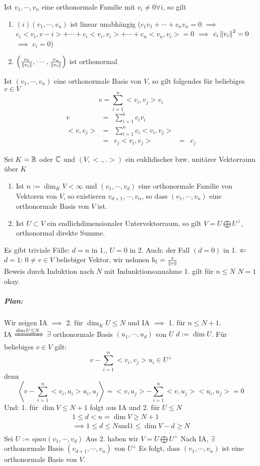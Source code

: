 \begin{Bem}
  Ist $v_1,\cdots,v_n$ eine orthonormale Familie mit $v_i \neq 0\forall i$, so gilt 
  \begin{enumerate}
    \item $(i)(v_1,\cdots,v_n)$ ist linear unabhängig ($c_1v_1+\cdots+c_nv_n=0$ $\implies$ $c_i <v_i,v-i>+\cdots+c_i<v_i,v_i>+\cdots+c_n<v_n,v_i>=0$ $\implies$ $c_i\left\| v_i \right\|^2=0$ $\implies$ $c_i=0$)
    \item $\left(\frac{v_1}{\left\| v_i \right\|},\cdots,\frac{v_n}{\left\| v_i \right\|}\right)$ ist orthonormal
  \end{enumerate}
\end{Bem}
\begin{Sat}
  Ist $(v_1,\cdots,v_n)$ eine orthonormale Basis von $V$, so gilt folgendes für beliebiges $v\in V$
  \[v=\sum^n_{i=1}<v_i,v_j>v_i\]
  \begin{align*}
    v&=&\sum^b_{i=1}c_iv_i\\
    <v,v_j>&=& \sum^n_{i=1}c_i<v_i,v_j>\\
    &=& c_j<v_i,v_j>
    &=& c_j
  \end{align*}
\end{Sat}
\begin{Prop}
  Sei $K$ $=\mathbb{R}$ oder $\mathbb{C}$ und $(V,<.,.>)$ ein euklidischer bzw. unitärer Vektorraum über $K$
  \begin{enumerate}
    \item Ist $n:=\dim_KV<\infty$ und $(v_1,\cdots,v_d)$ eine orthonormale Familie von Vektoren von $V$, so existieren $v_{d+1},\cdots,v_n$, so dass $(v_1,\cdots,v_n)$ eine orthonormale Basis von $V$ ist.
    \item Ist $U\subset V$ ein endlichdimensionaler Untervektorraum, so gilt $V=U\bigoplus U^\perp$, orthonormal direkte Summe.
  \end{enumerate}
\end{Prop}
\begin{Bew}
  Es gibt triviale Fälle: $d=n$ in 1., $U=0$ in 2. Auch: der Fall $(d=0)$ in 1. $\Leftarrow$ $d=1$: $0\neq v\in V$ beliebiger Vektor, wir nehmen $b_1=\frac{v}{\left\| v \right\|}$\\
  Beweis durch Induktion nach $N$ mit Indunktionsannahme 1. gilt für $n\leq N$ $N=1$ okay.
  \subparagraph{Plan:}Wir zeigen IA $\implies$ 2. für $\dim_KU\leq N$ und IA $\implies$ 1. für $n\leq N+1$.\\
  IA $\xRightarrow{\dim U \leq N}$ $\exists$ orthonormale Basis $(u_1,\cdots,u_d)$ von $U$ $d:=\dim U$. Für beliebiges $v\in V$ gilt:
  \[v-\sum^n_{i=1}<v_i,v_j>u_i\in U^\perp\]
  denn
  \[\left<v-\sum^n_{i=1}<v_i,u_i>u_i,u_j\right>=<v,u_j>-\sum^n_{i=1}<v,u_j><u_i,u_j>=0\]
  Und: 1. für $\dim V\leq N+1$ folgt aus IA und 2. für $U\leq N$
  \begin{align*}
    1\leq d<n=\dim V \geq N+1\\
    \implies 1\leq d \leq N \text{und} 1\leq \dim V-d \geq N\\
  \end{align*}
  Sei $U:= span(v_1,\cdots,v_d)$ Aus 2. haben wir $V=U\bigoplus U^\perp$ Nach IA, $\exists$ orthonormale Basis $(v_{d+1},\cdots,v_n)$ von $U^\perp$ Es folgt, dass $(v_1,\cdots,v_n)$ ist eine orthonormale Basis von $V$.
\end{Bew}
